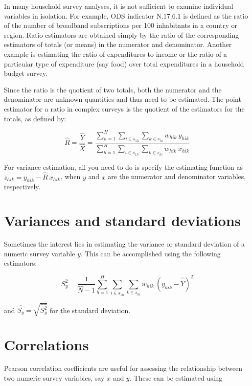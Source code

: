\documentclass[
  12pt,
]{book}
\begin{document}
In many household survey analyses, it is not sufficient to examine individual variables in isolation. For example, ODS indicator N.17.6.1 is defined as the ratio of the number of broadband subscriptions per 100 inhabitants in a country or region. Ratio estimators are obtained simply by the ratio of the corresponding estimators of totals (or means) in the numerator and denominator. Another example is estimating the ratio of expenditures to income or the ratio of a particular type of expenditure (say food) over total expenditures in a household budget survey.

Since the ratio is the quotient of two totals, both the numerator and the denominator are unknown quantities and thus need to be estimated. The point estimator for a ratio in complex surveys is the quotient of the estimators for the totals, as defined by:

\[
\widehat{R} = \frac{\widehat{Y}}{\widehat{X}}
= \frac{\sum_{h=1}^{H}\sum_{i \in s_{1h}} \sum_{ k \in s_{hi}}  w_{hik} \ y_{hik}}{\sum_{h=1}^{H}\sum_{i \in s_{1h}} \sum_{ k \in s_{hi}}  w_{hik} \ x_{hik}}
\]

For variance estimation, all you need to do is specify the estimating function as \(z_{hik} = y_{hik} - \widehat{R} \ x_{hik}\), when \(y\) and \(x\) are the numerator and denominator variables, respectively.

\hypertarget{variances-and-standard-deviations}{%
\section{Variances and standard deviations}\label{variances-and-standard-deviations}}

Sometimes the interest lies in estimating the variance or standard deviation of a numeric survey variable \(y\). This can be accomplished using the following estimators:

\[
\widehat{S_y^2} = \frac{1}{\widehat{N}-1}
{\sum_{h=1}^{H}\sum_{i \in s_{1h}} \sum_{ k \in s_{hi}}  w_{hik} \ \left( y_{hik} - \widehat{\overline{Y}} \right)^2}
\]

and \(\widehat{S_y} = \sqrt{\widehat{S_y^2}}\) for the standard deviation.

\hypertarget{correlations}{%
\section{Correlations}\label{correlations}}

Pearson correlation coefficients are useful for assessing the relationship between two numeric survey variables, say \(x\) and \(y\). These can be estimated using
\end{document}
